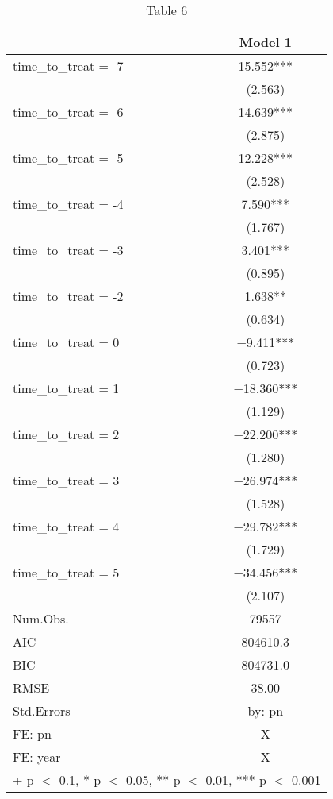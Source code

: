 \begin{table}

\caption{\label{tab:write-results}Table 6}
\centering
\begin{tabular}[t]{lc}
\toprule
  & Model 1\\
\midrule
time\_to\_treat = -7 & \num{15.552}***\\
 & (\num{2.563})\\
time\_to\_treat = -6 & \num{14.639}***\\
 & (\num{2.875})\\
time\_to\_treat = -5 & \num{12.228}***\\
 & (\num{2.528})\\
time\_to\_treat = -4 & \num{7.590}***\\
 & (\num{1.767})\\
time\_to\_treat = -3 & \num{3.401}***\\
 & (\num{0.895})\\
time\_to\_treat = -2 & \num{1.638}**\\
 & (\num{0.634})\\
time\_to\_treat = 0 & \num{-9.411}***\\
 & (\num{0.723})\\
time\_to\_treat = 1 & \num{-18.360}***\\
 & (\num{1.129})\\
time\_to\_treat = 2 & \num{-22.200}***\\
 & (\num{1.280})\\
time\_to\_treat = 3 & \num{-26.974}***\\
 & (\num{1.528})\\
time\_to\_treat = 4 & \num{-29.782}***\\
 & (\num{1.729})\\
time\_to\_treat = 5 & \num{-34.456}***\\
 & (\num{2.107})\\
\midrule
Num.Obs. & \num{79557}\\
AIC & \num{804610.3}\\
BIC & \num{804731.0}\\
RMSE & \num{38.00}\\
Std.Errors & by: pn\\
FE: pn & X\\
FE: year & X\\
\bottomrule
\multicolumn{2}{l}{\rule{0pt}{1em}+ p $<$ 0.1, * p $<$ 0.05, ** p $<$ 0.01, *** p $<$ 0.001}\\
\end{tabular}
\end{table}
